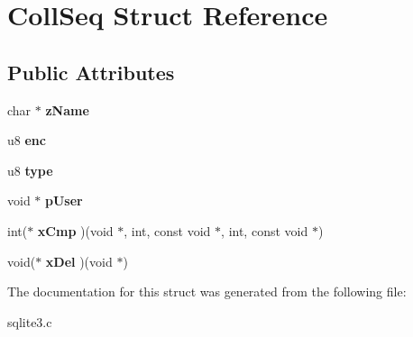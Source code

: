 \hypertarget{struct_coll_seq}{\section{Coll\-Seq Struct Reference}
\label{struct_coll_seq}
}
\subsection*{Public Attributes}
\begin{DoxyCompactItemize}
\item 
\hypertarget{struct_coll_seq_a48d6d5f71d4f8a3ab122903464e8b4a1}{char $\ast$ {\bfseries z\-Name}}\label{struct_coll_seq_a48d6d5f71d4f8a3ab122903464e8b4a1}

\item 
\hypertarget{struct_coll_seq_add27da1a70ed6f538447e9183eeb4838}{u8 {\bfseries enc}}\label{struct_coll_seq_add27da1a70ed6f538447e9183eeb4838}

\item 
\hypertarget{struct_coll_seq_ae8e3e561c3ff15d81758530573ceb5f9}{u8 {\bfseries type}}\label{struct_coll_seq_ae8e3e561c3ff15d81758530573ceb5f9}

\item 
\hypertarget{struct_coll_seq_a3cee924d41e730ccec7f686eb5b6f041}{void $\ast$ {\bfseries p\-User}}\label{struct_coll_seq_a3cee924d41e730ccec7f686eb5b6f041}

\item 
\hypertarget{struct_coll_seq_a47fc6d3a01eee354332ca515a8b493ce}{int($\ast$ {\bfseries x\-Cmp} )(void $\ast$, int, const void $\ast$, int, const void $\ast$)}\label{struct_coll_seq_a47fc6d3a01eee354332ca515a8b493ce}

\item 
\hypertarget{struct_coll_seq_a1c0dd3ad98c7bb2ef517f9170134a125}{void($\ast$ {\bfseries x\-Del} )(void $\ast$)}\label{struct_coll_seq_a1c0dd3ad98c7bb2ef517f9170134a125}

\end{DoxyCompactItemize}


The documentation for this struct was generated from the following file\-:\begin{DoxyCompactItemize}
\item 
sqlite3.\-c\end{DoxyCompactItemize}
